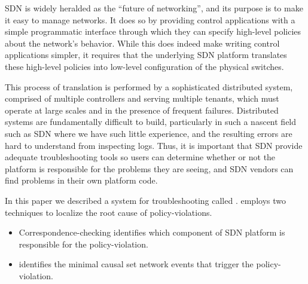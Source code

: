 SDN is widely heralded as the ``future of networking'', and its purpose is to make it easy to manage networks.  It does so by providing control applications with a simple programmatic interface through which they can specify high-level policies about the network's behavior. While this does indeed make writing control applications simpler, it requires that the underlying SDN platform translates these high-level policies into low-level configuration of the physical switches.

This process of translation is performed by a sophisticated distributed system, comprised of multiple controllers and serving multiple tenants, which must operate at large scales and in the presence of frequent failures. Distributed systems are fundamentally difficult to build, particularly in such a nascent field such as SDN where we have such little experience, and the resulting errors are hard to understand from inspecting logs. Thus, it is important that SDN provide adequate troubleshooting tools so users can determine whether or not the platform is responsible for the problems they are seeing, and SDN vendors can find problems in their own platform code.

In this paper we described a system for troubleshooting called \projectname{}. \projectname{} employs two techniques to localize the root cause of policy-violations.\begin{itemize}
    \item Correspondence-checking identifies which component of SDN platform is responsible for the policy-violation.
    \item  \Simulator{} identifies the minimal causal set network events that trigger the policy-violation.
\end{itemize}

